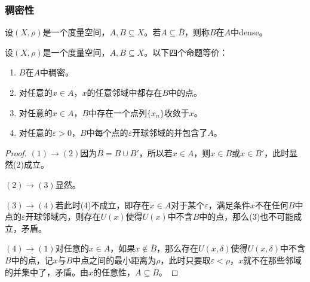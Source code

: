 \subsubsection{稠密性}
\begin{definition}
	设$(X,\rho)$是一个度量空间，$A,B\subseteq X$。若$A\subseteq\overline{B}$，则称$B$在$A$中\gls{dense}。
\end{definition}
\begin{theorem}\label{theo:Density}
	设$(X,\rho)$是一个度量空间，$A,B\subseteq X$。以下四个命题等价：
	\begin{enumerate}
		\item $B$在$A$中稠密。
		\item 对任意的$ x\in A$，$x$的任意邻域中都存在$B$中的点。
		\item 对任意的$ x\in A$，$B$中存在一个点列$\{x_n\}$收敛于$x$。
		\item 对任意的$\varepsilon>0$，$B$中每个点的$\varepsilon$开球邻域的并包含了$A$。
	\end{enumerate}
\end{theorem}
\begin{proof}
	$(1)\to(2)$因为$\overline{B}=B\cup B'$，所以若$x\in A$，则$x\in B$或$x\in B'$，此时显然(2)成立。\par
	$(2)\to(3)$显然。\par
	$(3)\to(4)$若此时(4)不成立，即存在$x\in A$对于某个$\varepsilon$，满足条件$x$不在任何$B$中点的$\varepsilon$开球邻域内，则存在$U(x)$使得$U(x)$中不含$B$中的点，那么(3)也不可能成立，矛盾。\par
	$(4)\to(1)$对任意的$ x\in A$，如果$x\notin \overline{B}$，那么存在$U(x,\delta)$使得$U(x,\delta)$中不含$B$中的点，记$x$与$B$中点之间的最小距离为$\rho$，此时只要取$\varepsilon<\rho$，$x$就不在那些邻域的并集中了，矛盾。由$x$的任意性，$A\subseteq\overline{B}$。
\end{proof}

